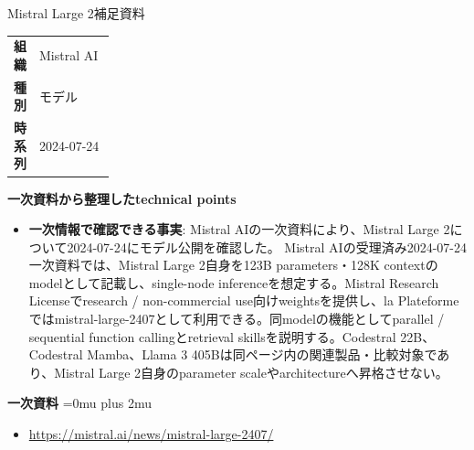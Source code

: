 \begin{technicalnote}{Mistral Large 2}{補足資料}
\begingroup
\begin{tabularx}{\linewidth}{@{}>{\bfseries}p{0.22\linewidth}X@{}}
組織 & Mistral AI \\
種別 & モデル \\
時系列 & 2024-07-24 \\
\end{tabularx}
\smallskip
{\bfseries 一次資料から整理したtechnical points}
\begin{itemize}[leftmargin=1.5em,itemsep=0.35em]
\item \textbf{一次情報で確認できる事実}: Mistral AIの一次資料により、Mistral Large 2について2024-07-24にモデル公開を確認した。 Mistral AIの受理済み2024-07-24一次資料では、Mistral Large 2自身を123B parameters・128K contextのmodelとして記載し、single-node inferenceを想定する。Mistral Research Licenseでresearch / non-commercial use向けweightsを提供し、la Plateformeではmistral-large-2407として利用できる。同modelの機能としてparallel / sequential function callingとretrieval skillsを説明する。Codestral 22B、Codestral Mamba、Llama 3 405Bは同ページ内の関連製品・比較対象であり、Mistral Large 2自身のparameter scaleやarchitectureへ昇格させない。
\end{itemize}
\begin{minipage}{\linewidth}
\begin{samepage}
{\bfseries 一次資料}
\begingroup\sloppy
\Urlmuskip=0mu plus 2mu\relax
\begin{itemize}[leftmargin=1.5em,itemsep=0.25em]
\item {\scriptsize\url{https://mistral.ai/news/mistral-large-2407/}}
\end{itemize}
\endgroup
\end{samepage}
\end{minipage}
\endgroup
\end{technicalnote}
\medskip


